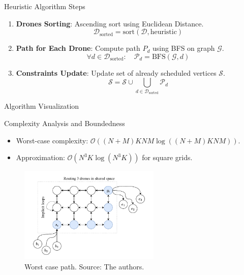 \begin{frame}{Heuristic Algorithm Steps}
    \begin{enumerate}
        \item \textbf{Drones Sorting}: Ascending sort using Euclidean Distance.
            \begin{equation}
                \mathcal{D}_{\text{sorted}} = \text{sort}(\mathcal{D}, \text{heuristic})
            \end{equation}
        \item \textbf{Path for Each Drone}: Compute path \(P_d\) using BFS on graph \(\mathcal{G}\).
            \begin{equation}
                \forall d \in \mathcal{D}_{\text{sorted}}: \quad \mathcal{P}_d = \text{BFS}(\mathcal{G}, d)
            \end{equation}
        \item \textbf{Constraints Update}: Update set of already scheduled vertices \(\mathcal{S}\).
            \begin{equation}
                \mathcal{S} = \mathcal{S} \cup \bigcup_{d \in \mathcal{D}_{\text{sorted}}} \mathcal{P}_d
            \end{equation}
    \end{enumerate}
\end{frame}

\begin{frame}{Algorithm Visualization}
    
\end{frame}

\begin{frame}{Complexity Analysis and Boundedness}
    \begin{itemize}
        \item Worst-case complexity: $\mathcal{O}((N+M) K N M \log((N+M) K N M))$.
        \item Approximation: $\mathcal{O}(N^3 K \log(N^3 K))$ for square grids.
    \end{itemize}
    \begin{figure}
      \centering
      \includegraphics[width=0.6\textwidth]{img/worst_path.drawio.pdf}
      \caption{Worst case path. Source: The authors.}
      \label{fig:worst_path}
    \end{figure}
\end{frame}

